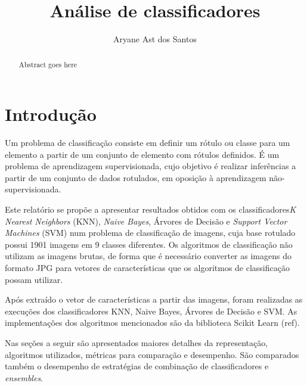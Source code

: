 \documentclass[conference]{IEEEtran}
\begin{document}
\title{Análise de classificadores}
\author{Aryane Ast dos Santos}



\author
{
}

\maketitle



\begin{abstract}
Abstract goes here

\end{abstract}


%


\section{Introdução}

Um problema de classificação consiste em definir um rótulo ou classe para um
elemento a partir de um conjunto de elemento com rótulos definidos. É um
problema de aprendizagem supervisionada, cujo objetivo é realizar inferências a
partir de um conjunto de dados rotulados, em oposição à aprendizagem
não-supervisionada.

Este relatório se propõe a apresentar resultados obtidos com os
classificadores\emph{K Nearest Neighbors} (KNN), \emph{Naive Bayes}, Árvores de
Decisão e \emph{Support Vector Machines} (SVM) num problema de classificação de
imagens, cuja base rotulado possui 1901 imagens em 9 classes diferentes.
Os algoritmos de classificação não utilizam as imagens brutas, de forma que é
necessário converter as imagens do formato JPG para vetores de características
que os algoritmos de classificação possam utilizar.

Após extraído o vetor de características a partir das imagens, foram realizadas
as execuções dos classificadores KNN, Naive Bayes, Árvores de Decisão e SVM. As
implementações dos algoritmos mencionados são da biblioteca Scikit Learn (ref).

Nas seções a seguir são apresentados maiores detalhes da representação,
algoritmos utilizados, métricas para comparação e desempenho.
São comparados também o desempenho de estratégias de combinação de
classificadores e \emph{ensembles}.
\end{document}
